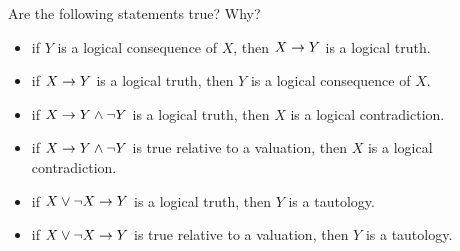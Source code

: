 \begin{practiceproblems}
\noindent\problempart
\label{pr.TT.meta}
Are the following statements true? Why?
\begin{itemize}
\item if $Y$ is a logical consequence of $X$, then $X\rightarrow Y$ is a logical truth.
\item if $X\rightarrow Y$ is a logical truth, then $Y$ is a logical consequence of $X$.
\item if $X\rightarrow Y\mathbin{\wedge}\neg Y$ is a logical truth, then $X$ is a logical contradiction.
\item if $X\rightarrow Y\mathbin{\wedge}\neg Y$ is true relative to a valuation, then $X$ is a logical contradiction.
\item if $X\vee\neg X\rightarrow Y$ is a logical truth, then $Y$ is a tautology.
\item if $X\vee\neg X\rightarrow Y$ is true relative to a valuation, then $Y$ is a tautology.
\end{itemize}
\end{practiceproblems}

